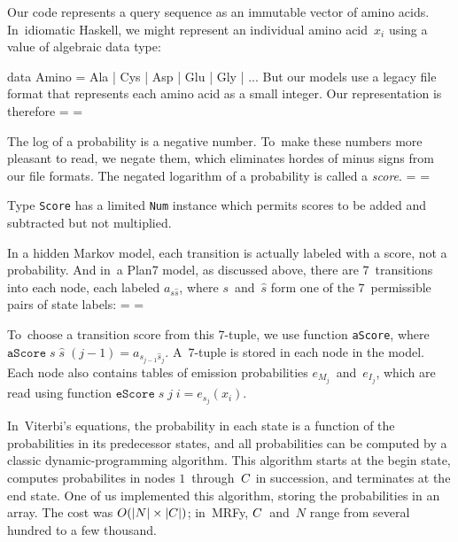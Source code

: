 \documentclass[preprint,nonatbib,blockstyle,times]{sigplanconf}
\newcommand\txprobj[3][]{a#1_{{#2}_{j-1}{#3}_j}}
\newcommand\alignwidth{\ensuremath C} %
\newif\ifverbatimsmall
\newenvironment{smallverbatim}{\par\small\verbatimsmalltrue\verbatim}{\endverbatim}
\newcommand\smallverbatiminput[1]{%
  \verbatimsmalltrue
  \presvtopsep=\topsep
  \topsep=0.78\topsep
  \verbatimsmallfalse
  \topsep=\presvtopsep
}
\begin{document}
Our code represents a query sequence as an immutable vector of amino
acids.
In~idiomatic Haskell, 
we might represent an individual amino acid~$x_i$
using a value of algebraic data type:
\begin{smallverbatim}
data Amino = Ala | Cys | Asp | Glu | Gly | ...
\end{smallverbatim}
But our models use a
legacy file format that represents each amino acid as a small integer.
Our representation is therefore
\smallverbatiminput{aa}


The log of a probability is a negative number.
To~make these numbers more pleasant to read, we negate them,
which eliminates hordes of minus signs from our file formats.
The negated logarithm of a probability is called a \emph{score}.
\smallverbatiminput{score}
Type \texttt{Score} has a limited \texttt{Num} instance which permits
scores to be added and subtracted but not multiplied.

In a hidden Markov model, each transition is actually labeled with a
score, not a probability.
And in~a Plan7 model, as discussed above, 
there are 7~transitions into each node,
each labeled $a_{s\hat s}$,
where $s$~and~$\hat s$ form one of the 7~permissible pairs of state
labels: 
\smallverbatiminput{tprob-tprobs}
To~choose a transition score from this 7-tuple, we use
function \texttt{aScore}, 
where
\mbox{$\mathtt{aScore}\;s\;\hat s\;(j-1) = \txprobj s {\hat s}$}.
A~7-tuple is stored in each node in
the model.
Each node also contains tables of emission probabilities
$e_{M_j}$~and~$e_{I_j}$, which are read using function
\mbox{$\mathtt{eScore}\;s\;j\;i = e_{s_j}(x_i)$}.


In~Viterbi's equations,
the probability in each state is a function of the probabilities
in its predecessor states, 
and all probabilities can be computed by a classic dynamic-programming
algorithm.
This algorithm starts at the begin state,
computes probabilites in nodes $1$~through~$\alignwidth$ in
succession, and terminates at the end state.
One of us implemented this algorithm, storing the probabilities in an array.
The cost was
$O(|N|\times|\alignwidth|)$;
in~MRFy, $\alignwidth$~and~$N$ range from several hundred to a few
thousand.
\end{document}
